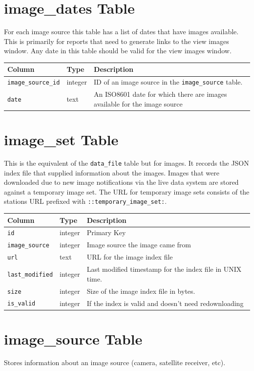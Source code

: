 \documentclass[a4paper,10pt]{book}
\begin{document}
\section{image\_dates Table}
For each image source this table has a list of dates that have images available. This is primarily for reports that need to generate links to the view images window. Any date in this table should be valid for the view images window.

\begin{tabular}{p{2.5cm} p{2.5cm} p{8.6cm}}
\hline
\textbf{Column} & \textbf{Type} & \textbf{Description} \\
\hline
\verb|image_source_id| & integer & ID of an image source in the \verb|image_source| table.\\
\verb|date| & text & An ISO8601 date for which there are images available for the image source \\
\hline
\end{tabular}

\section{image\_set Table}
This is the equivalent of the \verb|data_file| table but for images. It records the JSON index file that supplied information about the images. Images that were downloaded due to new image notifications via the live data system are stored against a temporary image set. The URL for temporary image sets consists of the stations URL prefixed with \verb|::temporary_image_set:|.


\begin{tabular}{p{2.5cm} p{2.5cm} p{8.6cm}}
\hline
\textbf{Column} & \textbf{Type} & \textbf{Description} \\
\hline
\verb|id| & integer & Primary Key\\
\verb|image_source| & integer & Image source the image came from\\
\verb|url| & text & URL for the image index file\\
\verb|last_modified| & integer & Last modified timestamp for the index file in UNIX time.\\
\verb|size| & integer & Size of the image index file in bytes.\\
\verb|is_valid| & integer & If the index is valid and doesn't need redownloading\\
\hline
\end{tabular}

\section{image\_source Table}
Stores information about an image source (camera, satellite receiver, etc).
\end{document}
